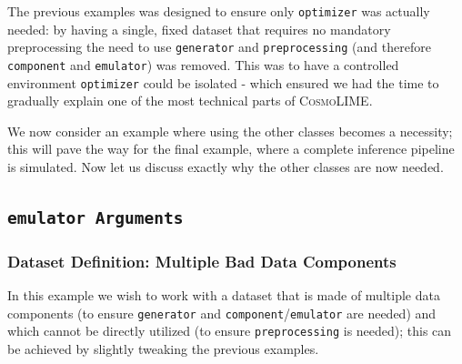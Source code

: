 


The previous examples was designed to ensure only \texttt{optimizer} was actually needed: by having a single, fixed dataset that requires no mandatory preprocessing the need to use \texttt{generator} and \texttt{preprocessing} (and therefore \texttt{component} and \texttt{emulator}) was removed. This was to have a controlled environment \texttt{optimizer} could be isolated - which ensured we had the time to gradually explain one of the most technical parts of \textsc{CosmoLIME}.


We now consider an example where using the other classes becomes a necessity; this will pave the way for the final example, where a complete inference pipeline is simulated. 
Now let us discuss exactly why the other classes are now needed.

\subsection{\texttt{emulator Arguments}}
\subsubsection{Dataset Definition: Multiple Bad Data Components}
In this example we wish to work with a dataset that is made of multiple data components (to ensure \texttt{generator} and \texttt{component}/\texttt{emulator} are needed) and which cannot be directly utilized (to ensure \texttt{preprocessing} is needed); this can be achieved by slightly tweaking the previous examples.

